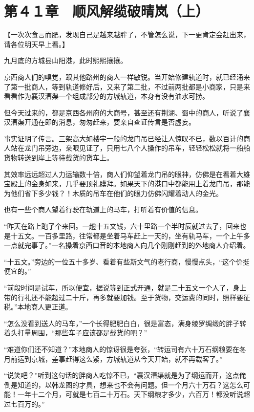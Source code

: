 \section{第４１章　顺风解缆破晴岚（上）}

【一次次食言而肥，发现自己是越来越胖了，不管怎么说，下一更肯定会赶出来，请各位明天早上看。】

九月底的方城县山阳港，此时熙熙攘攘。

京西商人们的嗅觉，跟其他路州的商人一样敏锐。当开始修建轨道时，就已经涌来了第一批商人，等到轨道修好后，又来了第二批，不过前两批都是小商家，只是来看看作为襄汉漕渠一个组成部分的方城轨道，本身有没有油水可捞。

但今天过来的，都是京西各州府的大商号，甚至还有荆湖、蜀中的商人，听说了襄汉漕渠开通在即的消息，匆匆赶来，要亲自查证传言是否虚妄。

事实证明了传言。三架高大如楼宇一般的龙门吊已经让人惊叹不已，数以百计的商人站在龙门吊旁边，亲眼见证了，只用七八个人操作的吊车，轻轻松松就将一船船货物转送到岸上等待载货的货车上。

其效率远远超过人力运输数十倍，商人们仰望着龙门吊的眼神，仿佛是在看着大雄宝殿上的金身如来，几乎要顶礼膜拜。如果天下的港口中都能用上着龙门吊，那能为他们省下多少钱？！木质的吊车在他们的眼力仿佛闪耀着动人的金光。

也有一些个商人望着行驶在轨道上的马车，打听着有价值的信息。

“昨天在路上跑了个来回。一趟十五文钱，六十里路一个半时辰就过去了，回来也是十五文。一百多里路，往常都是坐着马车赶上一天的，坐有轨马车，一个上午多一点就完事了。”一名操着京西口音的本地商人向几个刚刚赶到的外地商人介绍着。

“十五文。”旁边的一位五十多岁、看着有些斯文气的老行商，慢慢点头，“这个价挺便宜的。”

“前段时间是试车，所以便宜，据说等到正式开通，就是二十五文一个人了，身上带的行礼还不能超过二十斤，再多就要加钱。至于货物，交运费的同时，照样要征税。”本地商人更正道。

“怎么没看到送人的马车，”一个长得肥肥白白，很是富态，满身绫罗绸缎的胖子转着头打量周围，“那些车子应该都是载货的吧？”

“难道你们还不知道？”本地商人的惊讶很是夸张，“转运司有六十万石纲粮要在冬月前运到京城，差事赶得这么紧，方城轨道从今天开始，就不再载客了。”

“说笑吧？”听到这句话的胖商人吃惊不已，“襄汉漕渠就是为了纲运而开，这点俺倒是知道的，以韩龙图的才具，想来也不会有问题。但一个月六十万石？这怎么可能！一年十二个月，可就是七百二十万石。天下纲粮才多少，六百万！都没听说超过七百万的。”

